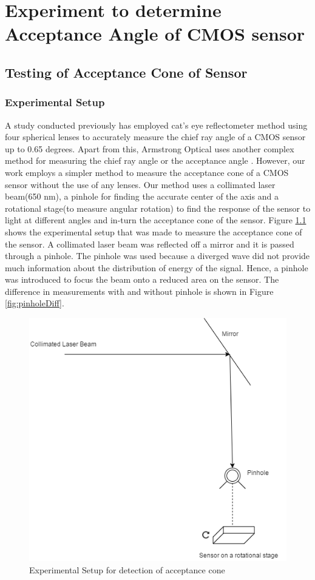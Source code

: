 \chapter{Experiment to determine Acceptance Angle of CMOS sensor}
\label{chp:Experiment_FOV}
\section{Testing of Acceptance Cone of Sensor}
\subsection{Experimental Setup}
A study conducted previously\cite{cra2} has employed cat's eye reflectometer method using four spherical lenses to accurately measure the chief ray angle of a CMOS sensor up to 0.65 degrees\cite{cra2}. Apart from this, Armstrong Optical uses another complex  method for measuring the chief ray angle or the acceptance angle\cite{cra1} . However, our work employs a simpler method to measure the acceptance cone of a CMOS sensor without the use of any lenses. Our method uses a collimated laser beam(650 nm), a pinhole for finding the accurate center of the axis and a rotational stage(to measure angular rotation) to find the response of the sensor to light at different angles and in-turn the acceptance cone of the sensor. 
Figure \ref{fig:exp_acc} shows the experimental setup that was made to measure the acceptance cone of the sensor. A collimated laser beam was reflected off a mirror and it is passed through a pinhole. The pinhole was used because a diverged wave did not provide much information about the distribution of energy of the signal. Hence, a pinhole was introduced to focus the beam onto a reduced area on the sensor. The difference in measurements with and without pinhole is shown in Figure \ref{fig:pinholeDiff}.
 \begin{figure}[ht]
\centering
\includegraphics[scale=0.50]{pics/acceptanceCone.png}
\caption{Experimental Setup for detection of acceptance cone}
\label{fig:exp_acc}
\end{figure}

